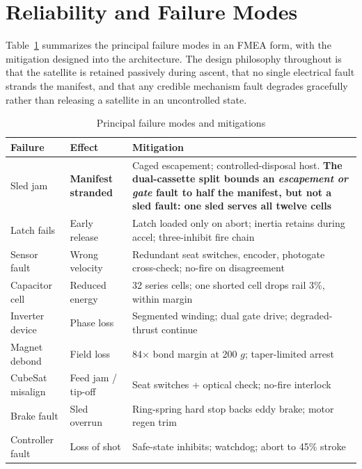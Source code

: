 \documentclass[conference]{IEEEtran}
\begin{document}
\section{Reliability and Failure Modes}\label{sec:fmea}
Table~\ref{tab:fmea} summarizes the principal failure modes in an FMEA form, with the mitigation designed into the architecture. The design philosophy throughout is that the satellite is retained passively during ascent, that no single electrical fault strands the manifest, and that any credible mechanism fault degrades gracefully rather than releasing a satellite in an uncontrolled state.

\begin{table}[t]
\caption{Principal failure modes and mitigations}
\label{tab:fmea}
\centering\footnotesize
\begin{tabular}{p{1.5cm}p{1.4cm}p{4.2cm}}
\toprule
Failure & Effect & Mitigation\\
\midrule
Sled jam & \textbf{Manifest stranded} & Caged escapement; controlled-disposal host. \textbf{The dual-cassette split bounds an \emph{escapement or gate} fault to half the manifest, but not a sled fault: one sled serves all twelve cells}\\
Latch fails & Early release & Latch loaded only on abort; inertia retains during accel; three-inhibit fire chain\\
Sensor fault & Wrong velocity & Redundant seat switches, encoder, photogate cross-check; no-fire on disagreement\\
Capacitor cell & Reduced energy & 32 series cells; one shorted cell drops rail 3\%, within margin\\
Inverter device & Phase loss & Segmented winding; dual gate drive; degraded-thrust continue\\
Magnet debond & Field loss & 84$\times$ bond margin at 200 $g$; taper-limited arrest\\
CubeSat misalign & Feed jam / tip-off & Seat switches + optical check; no-fire interlock\\
Brake fault & Sled overrun & Ring-spring hard stop backs eddy brake; motor regen trim\\
Controller fault & Loss of shot & Safe-state inhibits; watchdog; abort to 45\% stroke\\
\bottomrule
\end{tabular}
\end{table}
\end{document}

